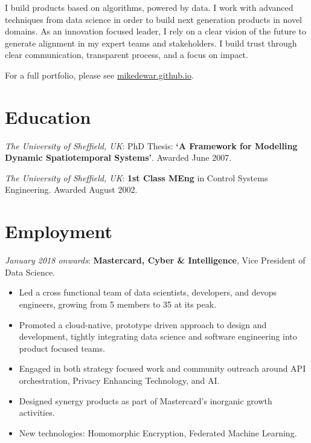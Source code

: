 \documentclass[line, overlapped]{res}
\providecommand{\tightlist}{%
  \setlength{\itemsep}{0pt}\setlength{\parskip}{0pt}}
\begin{document}

\address{
London\\
mikedewar@gmail.com
}

\begin{resume}

I build products based on algorithms, powered by data. I work with advanced techniques from data science in order to build next generation products in novel domains. As an innovation focused leader, I rely on a clear vision of the future to generate alignment in my expert teams and stakeholders.  I build trust through clear communication, transparent process, and a focus on impact.

For a full portfolio, please see \href{https://mikedewar.github.io}{mikedewar.github.io}.

\section{Education}

\emph{The University of Sheffield, UK}: PhD Thesis: \textbf{`A
  Framework for Modelling Dynamic Spatiotemporal Systems'}. Awarded June
  2007. 

\emph{The University of Sheffield, UK}: \textbf{1st Class MEng} in
  Control Systems Engineering. Awarded August 2002.

\section{Employment}

  \emph{January 2018 onwards}: \textbf{Mastercard, Cyber \&
  Intelligence}, Vice President of Data Science.
  \begin{itemize}
  \tightlist
	\item Led a cross functional team of data scientists, developers, and devops engineers, growing from 5 members to 35 at its peak.
	\item Promoted a cloud-native, prototype driven approach to design and development, tightly integrating data science and software engineering into product focused teams.
	\item Engaged in both strategy focused work and community outreach around API orchestration, Privacy Enhancing Technology, and AI.
	\item Designed synergy products as part of Mastercard's inorganic growth activities.
	\item New technologies: Homomorphic Encryption, Federated Machine Learning.
  \end{itemize}


\end{resume}
\end{document}
